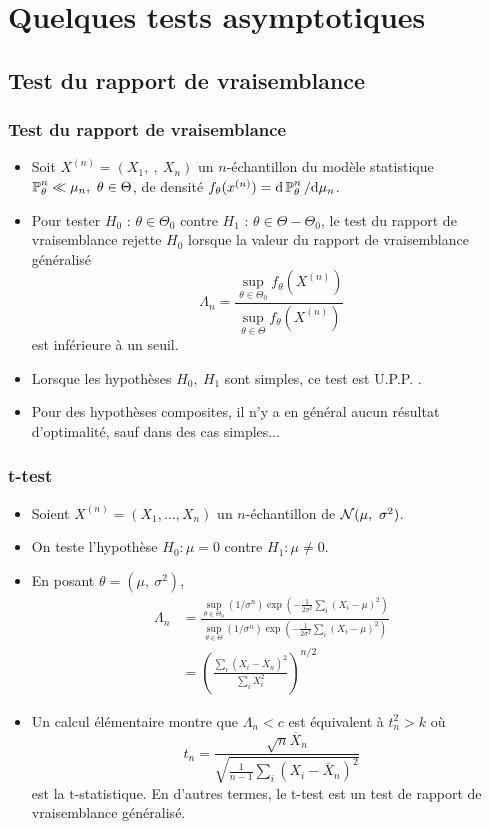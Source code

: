 \section{Quelques tests asymptotiques}

\subsection{Test du rapport de vraisemblance}
\begin{frame}
\frametitle{Test du rapport de vraisemblance}
 \begin{itemize}
 \item Soit  $X^{(n)}= (X_{1},\ ,\ X_{n})$ un $n$-échantillon du modèle statistique $\PP_{\theta}^{n}\ll\mu_{n},\ \theta\in\Theta$, de densité  $f_{\theta}(x^{(n)})= \mathrm{d} \operatorname{{\mathbb P}}_{\theta}^{n}/ \mathrm{d} \mu_{n}$.
 \item Pour tester $H_{0}$ : $\theta\in\Theta_{0}$  contre $H_{1}$ : $\theta\in\Theta-\Theta_{0}$, le test du \alert{rapport de vraisemblance} rejette $H_{0}$ lorsque la valeur du \alert{rapport de vraisemblance généralisé}
$$
\Lambda_{n}=\frac{\sup_{\theta\in\Theta_{0}}f_{\theta}(X^{(n)})}{\sup_{\theta\in\Theta}f_{\theta}(X^{(n)})}
$$
est inférieure à un seuil.
\item   Lorsque les hypothèses $H_{0},\ H_{1}$ sont simples, ce test est U.P.P. .
\item Pour des hypothèses composites, il n'y a en général aucun résultat d'optimalité, sauf dans des cas simples... 
\end{itemize}
\end{frame}

\begin{frame}
\frametitle{t-test}
\begin{itemize}
\item  Soient $X^{(n)}= (X_{1}, \dots, X_{n})$ un $n$-échantillon de $\mathcal{N}(\mu,\ \sigma^{2})$.
\item On teste l'hypothèse $H_0: \mu =0$ contre $H_1: \mu \ne 0$.
\item En posant $\theta=(\mu,\ \sigma^{2})$,
\begin{align*}
\Lambda_{n}&=\frac{\sup_{\theta\in\Theta_{0}}(1/\sigma^{n})\exp(-\frac{1}{2\sigma^{2}}\sum_{i}(X_{i}-\mu)^{2})}{\sup_{\theta\in\Theta}(1/\sigma^{n})\exp(-\frac{1}{2\sigma^{2}}\sum_{i}(X_{i}-\mu)^{2})}\\
&=(\frac{\sum_{i}(X_{i}-\overline{X}_{n})^{2}}{\sum_{i}X_{i}^{2}})^{n/2}
\end{align*}
\item Un calcul élémentaire montre que $\Lambda_{n}<c$ est équivalent à $t_{n}^{2}>k$ où
$$
t_{n}=\frac{\sqrt{n}\overline{X}_{n}}{\sqrt{\frac{1}{n-1}\sum_{i}(X_{i}-\overline{X}_{n})^{2}}}
$$
est la $\mathrm{t}$-statistique. En d'autres termes, le $\mathrm{t}$-test est un test de rapport de vraisemblance généralisé. 
\end{itemize}
\end{frame}


